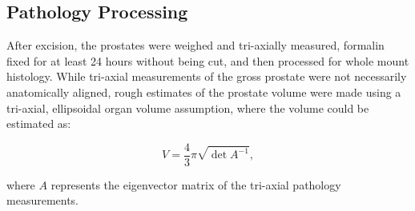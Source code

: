 \subsection{Pathology Processing}
After excision, the prostates were weighed and tri-axially measured, formalin
fixed for at least 24 hours without being cut, and then processed for whole
mount histology.  While tri-axial measurements of the gross prostate were not necessarily anatomically aligned, rough estimates of the prostate volume were made using a tri-axial, ellipsoidal organ volume assumption, where the volume could be estimated as:

\begin{equation}
V = \frac{4}{3}\pi \sqrt{\det{A^{-1}}},
\end{equation}

where $A$ represents the eigenvector matrix of the tri-axial pathology
measurements.

